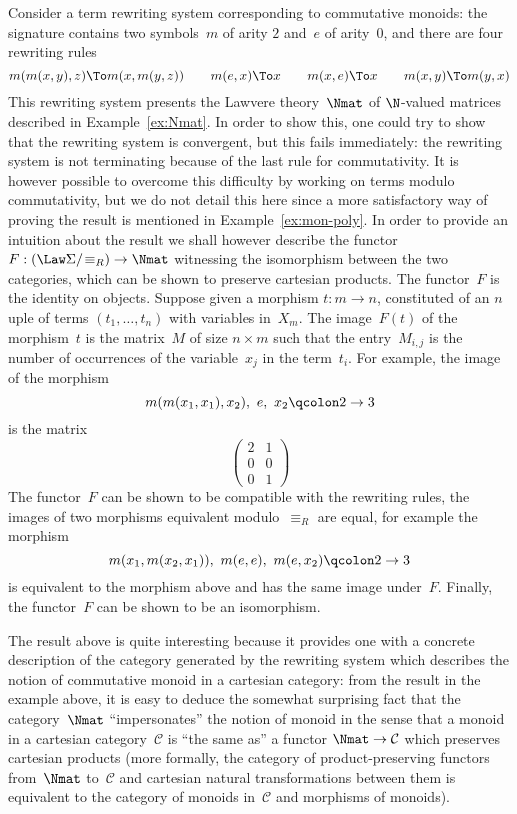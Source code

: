 \documentclass{LMCS}
\renewcommand{\C}{\mathcal{C}}
\begin{document}
\begin{exa}
  \label{ex:mon-trs}
  Consider a term rewriting system corresponding to commutative monoids: the
  signature contains two symbols~$m$ of arity $2$ and~$e$ of arity~$0$, and
  there are four rewriting rules
  \[
  m(m(x,y),z)\To m(x,m(y,z))
  \qquad
  m(e,x)\To x
  \qquad
  m(x,e)\To x
  \qquad
  m(x,y)\To m(y,x)
  \]
  This rewriting system presents the Lawvere theory~$\Nmat$ of $\N$-valued
  matrices described in Example~\ref{ex:Nmat}. In order to show this, one could
  try to show that the rewriting system is convergent, but this fails
  immediately: the rewriting system is not terminating because of the last rule
  for commutativity. It is however possible to overcome this difficulty by
  working on terms modulo commutativity, but we do not detail this here since a
  more satisfactory way of proving the result is mentioned in
  Example~\ref{ex:mon-poly}.
In order to provide an intuition about the result we shall however describe
  the functor~$F:(\Law\Sigma/\!\equiv_R)\to\Nmat$ witnessing the isomorphism
  between the two categories, which can be shown to preserve cartesian
  products. The functor~$F$ is the identity on objects. Suppose given a morphism
  $t:m\to n$, constituted of an $n$\nbd{}uple of terms $(t_1,\ldots,t_n)$ with
  variables in~$X_m$. The image~$F(t)$ of the morphism~$t$ is the matrix~$M$ of
  size $n\times m$ such that the entry~$M_{i,j}$ is the number of occurrences of
  the variable~$x_j$ in the term~$t_i$. For example, the image of the morphism
  \[
  m(m(x_1,x_1),x_2),\ e,\ x_2
  \qcolon
  2 \to 3
  \]
  is the matrix
  \[
  \left(
    \begin{matrix}
      2&1\\
      0&0\\
      0&1
    \end{matrix}
  \right)
  \]
  The functor~$F$ can be shown to be compatible with the rewriting rules, \ie
  the images of two morphisms equivalent modulo~$\equiv_R$ are equal, for
  example the morphism
  \[
  m(x_1,m(x_2,x_1)),\ m(e,e),\ m(e,x_2)
  \qcolon
  2\to 3
  \]
  is equivalent to the morphism above and has the same image under~$F$. Finally,
  the functor~$F$ can be shown to be an isomorphism.
\end{exa}

The result above is quite interesting because it provides one with a concrete
description of the category generated by the rewriting system which describes
the notion of commutative monoid in a cartesian category: from the result in the
example above, it is easy to deduce the somewhat surprising fact that the
category~$\Nmat$ ``impersonates'' the notion of monoid in the sense that a
monoid in a cartesian category~$\C$ is ``the same as'' a functor $\Nmat\to\C$
which preserves cartesian products (more formally, the category of
product-preserving functors from~$\Nmat$ to~$\C$ and cartesian natural
transformations between them is equivalent to the category of monoids in~$\C$
and morphisms of monoids).
\end{document}
